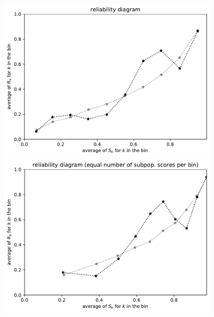 \documentclass{article}
\begin{document}
\begin{figure}
\begin{centering}
\parbox{\imsize}{\includegraphics[width=\imsize]
                {./codes/unweighted/50000_2500_10_1/equiscore.pdf}}
\quad\quad
\parbox{\imsize}{\includegraphics[width=\imsize]
                {./codes/unweighted/50000_2500_10_1/equisamps.pdf}}

\vspace{\vertsep}


\end{centering}
\end{figure}
\end{document}
